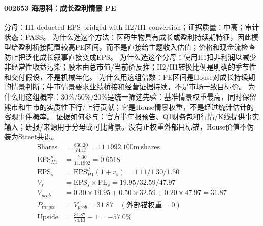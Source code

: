 \paragraph{002653 海思科：成长盈利情景 PE}
分母：H1 deducted EPS bridged with H2/H1 conversion；证据质量：中高；审计状态：PASS。
为什么选这个方法：医药生物具有成长或盈利持续期特征，因此模型给盈利桥接配置较高PE区间，而不是直接给主题收入估值；价格和现金流检查防止把泛化成长叙事直接变成EPS。
为什么选这个分母：使用H1扣非利润以减少非经常性收益污染；股本由总市值/当前价反推；H2/H1转换比例是明确的季节性和交付假设，不是机械年化。
为什么用这组倍数：PE区间是House对成长持续期的情景判断；牛市情景要求业绩桥接和经营证据持续，不是市场一致目标价。
为什么用这组概率：30\%/50\%/20\%是统一筛选先验：基准情景权重最高，同时保留熊市和牛市的实质性下行/上行贡献；它是House情景权重，不是经过统计估计的客观事件概率。
证据如何参与：官方半年报预告、Q1财务包和行情/K线提供事实输入；研报/来源用于分母或可比背景。没有正权重外部目标锚，House价值不伪装为Street共识。
\begin{align*}
\mathrm{Shares} &= \frac{830.20}{74.13}=11.1992\ \mathrm{100m\ shares}\\
\mathrm{EPS}_{H1}^d &= \frac{7.30}{11.1992}=0.6518\\
\mathrm{EPS}_s &= \mathrm{EPS}_{H1}^d(1+r_s)=1.11/1.30/1.50\\
V_s &= \mathrm{EPS}_s\times \mathrm{PE}_s=19.95/32.59/47.97\\
V_{prob} &= 0.30\times 19.95+0.50\times 32.59+0.20\times 47.97=31.87\\
P_{target} &= V_{prob}=31.87\quad(\text{外部锚权重}=0)\\
\mathrm{Upside} &= \frac{31.87}{74.13}-1=-57.0\%\\
\end{align*}

